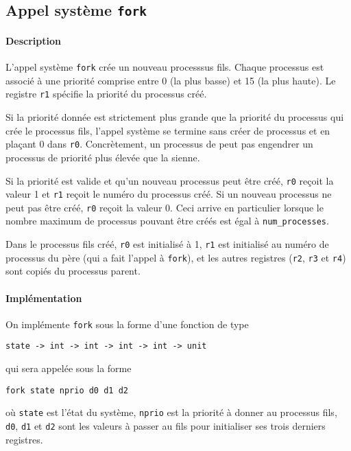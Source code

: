 \documentclass[french, toc]{../cs-classes/cs-classes}
\begin{document}
\subsection{Appel système \texttt{fork}}
\paragraph*{Description}
L'appel système \texttt{fork} crée un nouveau processsus fils. Chaque processus est associé à une priorité comprise entre 0 (la plus basse) et 15 (la plus haute). Le registre \texttt{r1} spécifie la priorité du processus créé. 

Si la priorité donnée est strictement plus grande que la priorité du processus qui crée le processus fils, l’appel système se termine sans créer de processus et en plaçant 0 dans \texttt{r0}. Concrètement, un processus de peut pas engendrer un processus de priorité plus élevée que la sienne. 

Si la priorité est valide et qu’un nouveau processus peut être créé, \texttt{r0} reçoit la valeur 1 et \texttt{r1} reçoit le numéro du processus créé. Si un nouveau processus ne peut pas être créé, \texttt{r0} reçoit la valeur 0. Ceci arrive en particulier lorsque le nombre maximum de processus pouvant être créés est égal à \texttt{num\_processes}.

Dans le processus ﬁls créé, \texttt{r0} est initialisé à 1, \texttt{r1} est initialisé au numéro de processus du père (qui a fait l’appel à \texttt{fork}), et les autres registres (\texttt{r2}, \texttt{r3} et \texttt{r4}) sont copiés du processus parent.

\paragraph*{Implémentation} On implémente \texttt{fork} sous la forme d'une fonction de type
\begin{center}
    \texttt{state -> int -> int -> int -> int -> unit}
\end{center}
qui sera appelée sous la forme
\begin{center}
    \texttt{fork state nprio d0 d1 d2}
\end{center}
où \texttt{state} est l'état du système, \texttt{nprio} est la priorité à donner au processus fils, \texttt{d0}, \texttt{d1} et \texttt{d2} sont les valeurs à passer au fils pour initialiser ses trois derniers registres.
\end{document}
